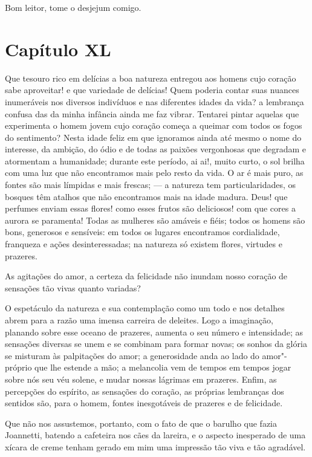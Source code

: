  Bom leitor, tome o desjejum comigo.

\section*{Capítulo XL}

 Que tesouro rico em delícias a boa natureza entregou aos homens cujo
coração sabe aproveitar! e que variedade de delícias! Quem poderia
contar suas nuances inumeráveis nos diversos indivíduos e nas
diferentes idades da vida? a lembrança confusa das da minha infância
ainda me faz vibrar. Tentarei pintar aquelas que experimenta o homem
jovem cujo coração começa a queimar com todos os fogos do sentimento?
Nesta idade feliz em que ignoramos ainda até mesmo o nome do interesse,
da ambição, do ódio e de todas as paixões vergonhosas que degradam e
atormentam a humanidade; durante este período, ai ai!, muito curto, o
sol brilha com uma luz que não encontramos mais pelo resto da vida. O
ar é mais puro, as fontes são mais límpidas e mais frescas; --- a
natureza tem particularidades, os bosques têm atalhos que não
encontramos mais na idade madura. Deus! que perfumes enviam essas
flores! como esses frutos são deliciosos! com que cores a aurora se
paramenta! Todas as mulheres são amáveis e fiéis; todos os homens são
bons, generosos e sensíveis: em todos os lugares encontramos
cordialidade, franqueza e ações desinteressadas; na natureza só existem
flores, virtudes e prazeres.

 As agitações do amor, a certeza da felicidade não inundam nosso coração
de sensações tão vivas quanto variadas?

 O espetáculo da natureza e sua contemplação como um todo e nos detalhes
abrem para a razão uma imensa carreira de deleites. Logo a imaginação,
planando sobre esse oceano de prazeres, aumenta o seu número e
intensidade; as sensações diversas se unem e se combinam para formar
novas; os sonhos da glória se misturam às palpitações do amor; a
generosidade anda ao lado do amor"-próprio que lhe estende a mão; a
melancolia vem de tempos em tempos jogar sobre nós seu véu solene, e
mudar nossas lágrimas em prazeres. Enfim, as percepções do espírito, as
sensações do coração, as próprias lembranças dos sentidos são, para o
homem, fontes inesgotáveis de prazeres e de felicidade.

 Que não nos assustemos, portanto, com o fato de que o barulho que fazia
Joannetti, batendo a cafeteira nos cães da lareira, e o aspecto
inesperado de uma xícara de creme tenham gerado em mim uma impressão
tão viva e tão agradável.

